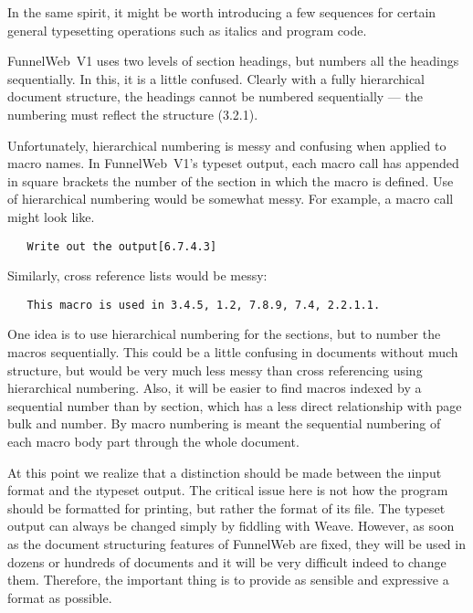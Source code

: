 In the same spirit, it might be worth introducing a few  sequences for
certain general typesetting operations such as italics and program code.

 FunnelWeb~V1
uses two levels of section headings, but numbers all
the headings sequentially. In this, it is a little confused. Clearly
with a fully hierarchical document structure, the headings cannot be
numbered sequentially --- the numbering must reflect the structure
(\eg{}3.2.1).

 Unfortunately,
hierarchical numbering is messy
and confusing when applied to macro names.
In FunnelWeb~V1's typeset output, each macro
call has appended in square brackets the number of the section in which the
macro is defined. Use of hierarchical numbering would be somewhat messy.
For example, a macro call might look like.

\begin{verbatim}
   Write out the output[6.7.4.3]
\end{verbatim}

Similarly, cross reference lists would be messy:

\begin{verbatim}
   This macro is used in 3.4.5, 1.2, 7.8.9, 7.4, 2.2.1.1.
\end{verbatim}

 One
idea is to use hierarchical numbering for the sections, but to
number the macros sequentially. This could be a little confusing in
documents without much structure, but would be very much less messy than
cross referencing using hierarchical numbering.
Also, it will be easier to find macros
indexed by a sequential number than by section,
which has a less direct relationship
with page bulk and number. By macro numbering is meant the sequential
numbering of each macro body part through the whole document.

 At this point we
realize that a distinction should be made between
the \i{input format} and the \i{typeset output}.
The critical issue here is not how the
program should be formatted for printing, but rather the format of its
 file. The typeset output can always be changed simply by fiddling
with Weave. However, as soon as the document structuring features of FunnelWeb
are fixed, they will be used in dozens or hundreds of documents and it will
be very difficult indeed to change them. Therefore, the important thing is to
provide as sensible and expressive a  format as possible.


